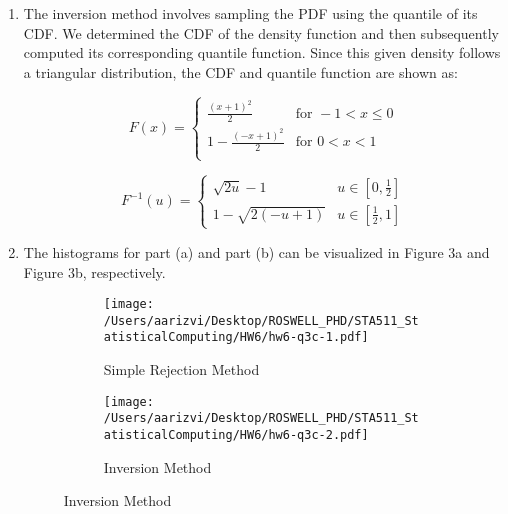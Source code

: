 \documentclass[letterpaper]{article}
\begin{document}
\begin{enumerate}
\begin{enumerate}
\item The inversion method involves sampling the PDF using the quantile of its CDF. We determined the CDF of the density function and then subsequently computed its corresponding quantile function. Since this given density follows a triangular distribution,  the CDF and quantile function are shown as:

$$
F(x) =
\begin{cases}
\frac{(x+1)^{2}}{2} & \text{for } -1 < x \leq 0\\
1 - \frac{(-x+1)^{2}}{2} & \text{for } 0 < x < 1 \\
\end{cases}
$$

$$
F^{-1}(u) =
\begin{cases}
\sqrt{2u}-1 & u \in [0,\frac{1}{2}]\\
1-\sqrt{2(-u+1)}& u \in [\frac{1}{2},1]
\end{cases}
$$


\item The histograms for part (a) and part (b) can be visualized in Figure 3a and Figure 3b, respectively.
\begin{figure}
    \centering
    \caption{}
    \begin{subfigure}{0.4\textwidth}
        \centering
        \texttt{[image: /Users/aarizvi/Desktop/ROSWELL\_PHD/STA511\_StatisticalComputing/HW6/hw6-q3c-1.pdf]}
        \caption{Simple Rejection Method}
    \end{subfigure}
    \begin{subfigure}{0.4\textwidth}
        \centering
        \texttt{[image: /Users/aarizvi/Desktop/ROSWELL\_PHD/STA511\_StatisticalComputing/HW6/hw6-q3c-2.pdf]} 
        \caption{Inversion Method}
    \end{subfigure}
\end{figure}



\end{enumerate}


\end{enumerate}
\end{document}
